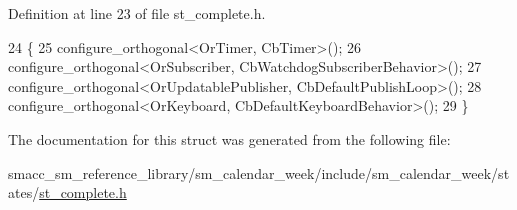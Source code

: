 Definition at line 23 of file st\+\_\+complete.\+h.


\begin{DoxyCode}
24     \{
25         configure\_orthogonal<OrTimer, CbTimer>();   
26         configure\_orthogonal<OrSubscriber, CbWatchdogSubscriberBehavior>();
27         configure\_orthogonal<OrUpdatablePublisher, CbDefaultPublishLoop>();
28         configure\_orthogonal<OrKeyboard, CbDefaultKeyboardBehavior>();
29     \}
\end{DoxyCode}


The documentation for this struct was generated from the following file\+:\begin{DoxyCompactItemize}
\item 
smacc\+\_\+sm\+\_\+reference\+\_\+library/sm\+\_\+calendar\+\_\+week/include/sm\+\_\+calendar\+\_\+week/states/\hyperlink{sm__calendar__week_2include_2sm__calendar__week_2states_2st__complete_8h}{st\+\_\+complete.\+h}\end{DoxyCompactItemize}
